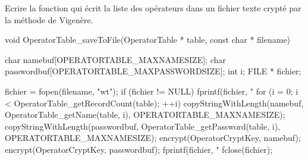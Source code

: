 Ecrire la fonction  qui écrit la liste des opérateurs dans un fichier texte crypté par la méthode de Vigenère.

\begin{csourcecorrection}
void OperatorTable_saveToFile(OperatorTable * table, const char * filename) {
    char namebuf[OPERATORTABLE_MAXNAMESIZE];
    char passwordbuf[OPERATORTABLE_MAXPASSWORDSIZE];
    int i;
    FILE * fichier;

    fichier = fopen(filename, "wt");
    if (fichier != NULL) {
        fprintf(fichier, "%
        for (i = 0; i < OperatorTable_getRecordCount(table); ++i) {
            copyStringWithLength(namebuf, OperatorTable_getName(table, i),
                    OPERATORTABLE_MAXNAMESIZE);
            copyStringWithLength(passwordbuf, OperatorTable_getPassword(table, i),
                    OPERATORTABLE_MAXNAMESIZE);
            encrypt(OperatorCryptKey, namebuf);
            encrypt(OperatorCryptKey, passwordbuf);
            fprintf(fichier, "%
        }
        fclose(fichier);
    }
}
\end{csourcecorrection}




